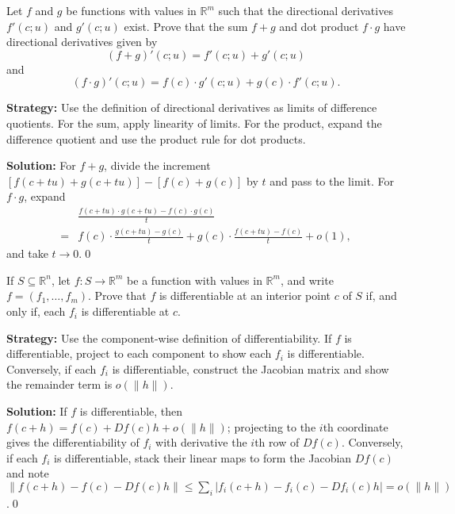 \begin{problembox}
\begin{problemstatement}
Let \( f \) and \( g \) be functions with values in \( \mathbb{R}^m \) such that the directional derivatives \( f'(c; u) \) and \( g'(c; u) \) exist. Prove that the sum \( f + g \) and dot product \( f \cdot g \) have directional derivatives given by
\[(f + g)'(c; u) = f'(c; u) + g'(c; u)\]
and
\[(f \cdot g)'(c; u) = f(c) \cdot g'(c; u) + g(c) \cdot f'(c; u).\]
\end{problemstatement}
\end{problembox}

\noindent\textbf{Strategy:} Use the definition of directional derivatives as limits of difference quotients. For the sum, apply linearity of limits. For the product, expand the difference quotient and use the product rule for dot products.

\bigskip\noindent\textbf{Solution:}
For $f+g$, divide the increment $[f(c+tu)+g(c+tu)]-[f(c)+g(c)]$ by $t$ and pass to the limit. For $f\cdot g$, expand
\begin{align*}
&\frac{f(c+tu)\cdot g(c+tu)-f(c)\cdot g(c)}{t} \\
=&f(c)\cdot\frac{g(c+tu)-g(c)}{t}+g(c)\cdot\frac{f(c+tu)-f(c)}{t}+o(1),
\end{align*}
and take $t\to0$.\qed


\begin{problembox}
\begin{problemstatement}
If \( S \subseteq \mathbb{R}^n \), let \( f: S \to \mathbb{R}^m \) be a function with values in \( \mathbb{R}^m \), and write \( f = (f_1, \ldots, f_m) \). Prove that \( f \) is differentiable at an interior point \( c \) of \( S \) if, and only if, each \( f_i \) is differentiable at \( c \).
\end{problemstatement}
\end{problembox}

\noindent\textbf{Strategy:} Use the component-wise definition of differentiability. If \( f \) is differentiable, project to each component to show each \( f_i \) is differentiable. Conversely, if each \( f_i \) is differentiable, construct the Jacobian matrix and show the remainder term is \( o(\|h\|) \).

\bigskip\noindent\textbf{Solution:}
If $f$ is differentiable, then $f(c+h)=f(c)+Df(c)h+o(\|h\|)$; projecting to the $i$th coordinate gives the differentiability of $f_i$ with derivative the $i$th row of $Df(c)$. Conversely, if each $f_i$ is differentiable, stack their linear maps to form the Jacobian $Df(c)$ and note $\|f(c+h)-f(c)-Df(c)h\|\le\sum_i |f_i(c+h)-f_i(c)-Df_i(c)h|=o(\|h\|)$.\qed



